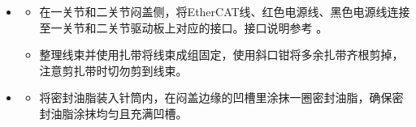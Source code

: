 \documentclass[a4paper,11pt,english,openany,oneside]{sphinxmanual}
\begin{document}
\begin{itemize}
\begin{itemize}
\begin{quote}
\begin{figure}[H]
\centering
\capstart

\noindent{}
\caption{二关节大臂凸台对齐凹槽}\label{\detokenize{_u66f4_u6362_u5173_u8282:id134}}\end{figure}
\end{quote}

\item {} 
\sphinxAtStartPar
将固定关节的外六角螺栓和垫片放入二关节的螺纹孔中，并使用开口扳手按对角顺序拧紧螺栓。扳手和螺栓的规格参考 {\hyperref[\detokenize{_u66f4_u6362_u5173_u8282:id9}]{}} 。
\begin{quote}

\begin{figure}[H]
\centering
\capstart

\noindent{}
\caption{拧紧二关节螺钉}\label{\detokenize{_u66f4_u6362_u5173_u8282:id135}}\end{figure}
\end{quote}

\end{itemize}

\item {} 
\sphinxAtStartPar
{}
\begin{itemize}
\item {} 
\sphinxAtStartPar
在一关节和二关节闷盖侧，将EtherCAT线、红色电源线、黑色电源线连接至一关节和二关节驱动板上对应的接口。接口说明参考 {\hyperref[\detokenize{_u66f4_u6362_u5173_u8282:id11}]{}} 。

\item {} 
\sphinxAtStartPar
整理线束并使用扎带将线束成组固定，使用斜口钳将多余扎带齐根剪掉，注意剪扎带时切勿剪到线束。

\end{itemize}

\item {} 
\sphinxAtStartPar
{}
\begin{itemize}
\item {} 
\sphinxAtStartPar
将密封油脂装入针筒内，在闷盖边缘的凹槽里涂抹一圈密封油脂，确保密封油脂涂抹均匀且充满凹槽。

\end{itemize}
\begin{quote}


\end{quote}
\end{itemize}
\end{document}
